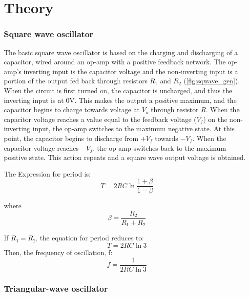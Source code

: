 \section{Theory}
\subsubsection{Square wave oscillator}
The basic square wave oscillator is based on the charging and discharging of a capacitor, wired around an op-amp with a positive feedback network. The op-amp's inverting input is the capacitor voltage and the non-inverting input is a portion of the output fed back through resistors $R_1$ and $R_2$ 
(\ref{fig:sqwave_gen}). When the circuit is
first turned on, the capacitor is uncharged, and thus the inverting input is at 0V. This makes the output a positive maximum, and the capacitor begins to charge towards voltage at $V_o$
through resistor $R$. When the capacitor voltage reaches a value equal to the feedback voltage
($V_f$) on the non-inverting input, the op-amp switches to the maximum negative state. At this point, the capacitor begins to discharge from $+V_f$ towards $-V_f$. When the capacitor voltage
reaches $-V_f$, the op-amp switches back to the maximum positive state. This action repeats and a square wave output voltage is obtained.

The Expression for period is:
\[
T=2 RC \ln\dfrac{1+\beta}{1-\beta}
\]

where 
\[
\beta=\dfrac{R_2}{R_1+R_2}
\]

If $R_1 = R_2$, the equation for period reduces to:
\[
T=2 RC \ln 3
\] 
Then, the frequency of oscillation, f:
\[
f=\dfrac{1}{2RC \ln 3}
\] 
\subsubsection{Triangular-wave oscillator}


